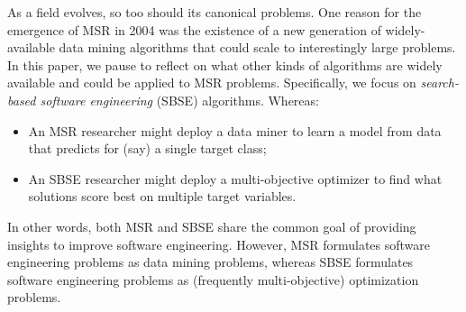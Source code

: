 \documentclass[sigconf,anonymous,review]{acmart}
\begin{document}
As a field evolves, so too should its canonical problems. One  reason for the emergence of   MSR  in 2004 was the existence of a new generation of widely-available data mining
algorithms that could scale to interestingly large problems. In this paper,
we pause to reflect on what other kinds of algorithms are widely available and could
be applied to MSR problems.  Specifically, we focus on
{\em search-based software engineering} (SBSE) algorithms. Whereas:
\begin{itemize}
\item
An MSR researcher might deploy a
data miner to learn a model from  data   that predicts for (say) a single target class;
\item
An SBSE researcher might deploy a multi-objective optimizer
to find what {solutions} score best
on multiple target variables.
\end{itemize}

{In other words, both MSR and SBSE share the common goal of providing insights to improve software engineering. However, MSR formulates software engineering problems as data mining problems, whereas SBSE formulates software engineering problems as (frequently multi-objective) optimization problems.}



 
\end{document}
